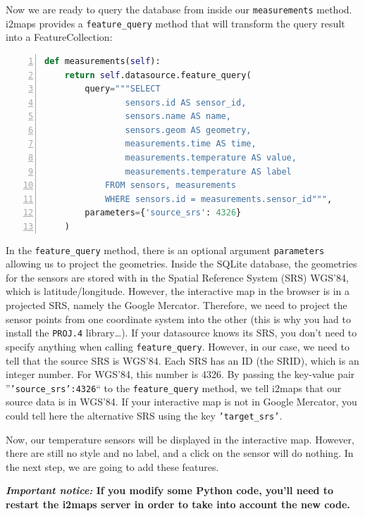 \documentclass[11pt]{article}
\begin{document}
Now we are ready to query the database from inside our \texttt{measurements} method. i2maps provides a \texttt{feature\_query} method that will transform the query result into a FeatureCollection:

\begin{lstlisting}[language=Python, numbers=left, numberstyle=\footnotesize, numbersep=5pt]
def measurements(self):
    return self.datasource.feature_query(
        query="""SELECT 
                sensors.id AS sensor_id,
                sensors.name AS name,
                sensors.geom AS geometry,
                measurements.time AS time,
                measurements.temperature AS value,
                measurements.temperature AS label
            FROM sensors, measurements
            WHERE sensors.id = measurements.sensor_id""", 
        parameters={'source_srs': 4326}
    )
\end{lstlisting}

In the \texttt{feature\_query} method, there is an optional argument \texttt{parameters} allowing us to project the geometries. Inside the SQLite database, the geometries for the sensors are stored with in the Spatial Reference System (SRS) WGS'84, which is latitude/longitude. However, the interactive map in the browser is in a projected SRS, namely the Google Mercator. Therefore, we need to project the sensor points from one coordinate system into the other (this is why you had to install the \texttt{PROJ.4} library\dots). If your datasource knows its SRS, you don't need to specify anything when calling \texttt{feature\_query}. However, in our case, we need to tell that the source SRS is WGS'84. Each SRS has an ID (the SRID), which is an integer number. For WGS'84, this number is 4326. By passing the key-value pair ''\texttt{'source\_srs':4326}`` to the \texttt{feature\_query} method, we tell i2maps that our source data is in WGS'84. If your interactive map is not in Google Mercator, you could tell here the alternative SRS using the key \texttt{'target\_srs'}.

Now, our temperature sensors will be displayed in the interactive map. However, there are still no style and no label, and a click on the sensor will do nothing. In the next step, we are going to add these features.

\textbf{\emph{Important notice:} If you modify some Python code, you'll need to restart the i2maps server in order to take into account the new code.}
\end{document}
